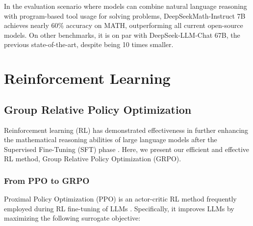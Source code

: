 In the evaluation scenario where models can combine natural language reasoning with program-based tool usage for solving problems, DeepSeekMath-Instruct 7B achieves nearly 60\% accuracy on MATH, outperforming all current open-source models. On other benchmarks, it is on par with DeepSeek-LLM-Chat 67B, the previous state-of-the-art, despite being 10 times smaller.
\section{Reinforcement Learning}

\subsection{Group Relative Policy Optimization} Reinforcement learning (RL) has demonstrated effectiveness in further enhancing the mathematical reasoning abilities of large language models after the Supervised Fine-Tuning (SFT) phase \citep{wang2023math,wizardmath}. Here, we present our efficient and effective RL method, Group Relative Policy Optimization (GRPO).

\subsubsection{From PPO to GRPO} Proximal Policy Optimization (PPO) \citep{schulman2017proximal} is an actor-critic RL method frequently employed during RL fine-tuning of LLMs \citep{ouyang2022training}. Specifically, it improves LLMs by maximizing the following surrogate objective:

